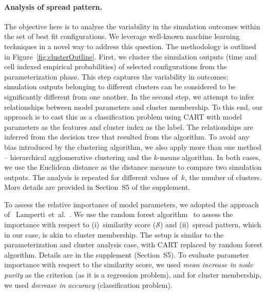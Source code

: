 \documentclass[11pt]{article}
\newcommand{\similarity}{\mathcal{S}}
\theoremstyle{definition}
\begin{document}

\paragraph{Analysis of spread pattern.} The objective here is to analyse
the variability in the simulation outcomes within the set of best fit
configurations. We leverage well-known machine learning techniques in a
novel way to address this question. The methodology is outlined in
Figure~\ref{fig:clusterOutline}. First, we cluster the simulation outputs
(time and cell indexed empirical probabilities) of selected configurations
from the parameterization phase. This step captures the variability in
outcomes; simulation outputs belonging to different clusters can be
considered to be significantly different from one another.  In the second
step, we attempt to infer relationships between model parameters and
cluster membership. To this end, our approach is to cast this as a
classification problem using CART with model parameters as the features and
cluster index as the label. The relationships are inferred from the
decision tree that resulted from the algorithm.  To avoid any bias
introduced by the clustering algorithm, we also apply more than one method
-- hierarchical agglomerative clustering and the $k$-means algorithm. In
both cases, we use the Euclidean distance as the distance measure to
compare two simulation outputs. The analysis is repeated for different
values of~$k$, the number of clusters.  More details are provided in
Section~S5 of the supplement. 

To assess the relative importance of model parameters, we adopted the
approach of~ Lamperti~et~al.~\cite{lamperti2018agent}. We use the random
forest algorithm~\cite{breiman2001random} to assess the importance with
respect to (i)~similarity score
($\similarity$) and (ii)~spread pattern, which in our case, is akin to
cluster membership. The setup is similar to the parameterization and
cluster analysis case, with CART replaced by random forest algorithm. 
Details are in the supplement (Section~S5). To evaluate
parameter importance with respect to the similarity score, we used
\emph{mean increase in node purity} as the criterion (as it is a regression
problem), and for cluster membership, we used \emph{decrease in accuracy}
(classification problem).
\end{document}
